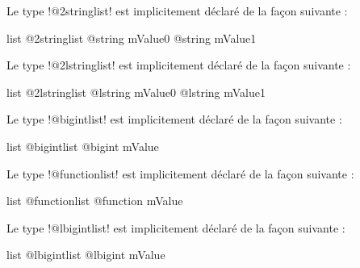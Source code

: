 Le type \ggs!@2stringlist! est implicitement déclaré de la façon suivante :

\begin{galgasbox}
list @2stringlist {
  @string mValue0
  @string mValue1
}
\end{galgasbox}









Le type \ggs!@2lstringlist! est implicitement déclaré de la façon suivante :

\begin{galgasbox}
list @2lstringlist {
  @lstring mValue0
  @lstring mValue1
}
\end{galgasbox}









Le type \ggs!@bigintlist! est implicitement déclaré de la façon suivante :

\begin{galgasbox}
list @bigintlist {
  @bigint mValue
}
\end{galgasbox}









Le type \ggs!@functionlist! est implicitement déclaré de la façon suivante :

\begin{galgasbox}
list @functionlist {
  @function mValue
}
\end{galgasbox}









Le type \ggs!@lbigintlist! est implicitement déclaré de la façon suivante :

\begin{galgasbox}
list @lbigintlist {
  @lbigint mValue
}
\end{galgasbox}










